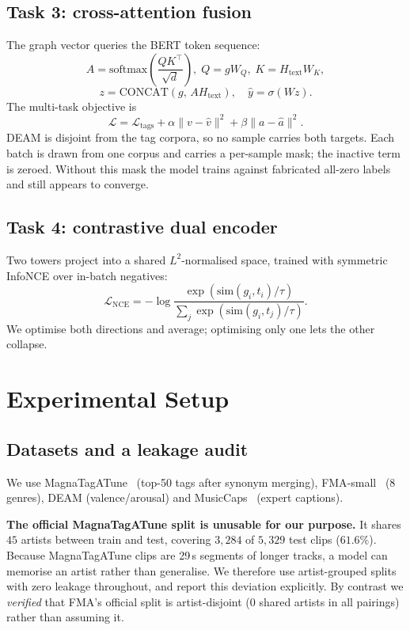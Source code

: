 \documentclass[conference]{IEEEtran}
\begin{document}
\subsection{Task 3: cross-attention fusion}
The graph vector queries the BERT token sequence:
\begin{equation}
A = \mathrm{softmax}\!\left(\frac{QK^\top}{\sqrt{d}}\right),\;
Q = gW_Q,\; K = H_{\mathrm{text}}W_K,
\end{equation}
\begin{equation}
z = \mathrm{CONCAT}(g,\, A H_{\mathrm{text}}), \quad \hat{y} = \sigma(Wz).
\end{equation}
The multi-task objective is
\begin{equation}
\mathcal{L} = \mathcal{L}_{\mathrm{tags}}
+ \alpha \lVert v - \hat{v} \rVert^2
+ \beta  \lVert a - \hat{a} \rVert^2 .
\end{equation}
DEAM is disjoint from the tag corpora, so no sample carries both targets. Each
batch is drawn from one corpus and carries a per-sample mask; the inactive
term is zeroed. Without this mask the model trains against fabricated
all-zero labels and still appears to converge.

\subsection{Task 4: contrastive dual encoder}
Two towers project into a shared $L^2$-normalised space, trained with
symmetric InfoNCE over in-batch negatives:
\begin{equation}
\mathcal{L}_{\mathrm{NCE}} = -\log
\frac{\exp(\mathrm{sim}(g_i,t_i)/\tau)}
     {\sum_j \exp(\mathrm{sim}(g_i,t_j)/\tau)} .
\end{equation}
We optimise both directions and average; optimising only one lets the other
collapse.

\section{Experimental Setup}

\subsection{Datasets and a leakage audit}
We use MagnaTagATune~\cite{mtat} (top-50 tags after synonym merging), FMA-small~\cite{fma} (8 genres),
DEAM (valence/arousal) and MusicCaps~\cite{musiccaps} (expert captions).

\textbf{The official MagnaTagATune split is unusable for our purpose.} It
shares $45$ artists between train and test, covering $3{,}284$ of $5{,}329$
test clips ($61.6\%$). Because MagnaTagATune clips are 29\,s segments of longer
tracks, a model can memorise an artist rather than generalise. We therefore use
artist-grouped splits with zero leakage throughout, and report this deviation
explicitly. By contrast we \emph{verified} that FMA's official split is
artist-disjoint (0 shared artists in all pairings) rather than assuming it.
\end{document}
